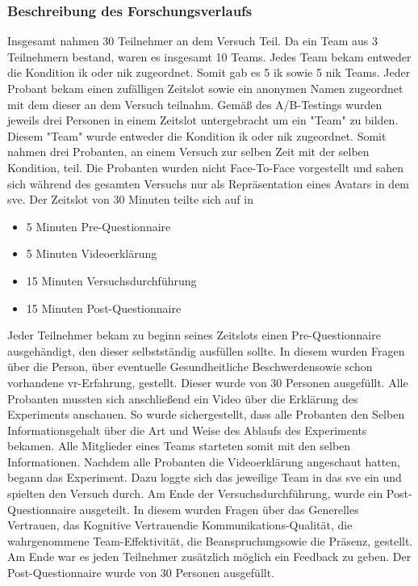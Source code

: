 \documentclass[a4paper,11pt]{article}%
\renewcommand{\\}{\vspace*{0.5\baselineskip} \newline}
\begin{document}
	\subsubsection{Beschreibung des Forschungsverlaufs}
Insgesamt nahmen 30 Teilnehmer an dem Versuch Teil. Da ein Team aus 3 Teilnehmern bestand, waren es insgesamt 10 Teams. Jedes Team bekam entweder die Kondition \ac{ik} oder \ac{nik} zugeordnet. Somit gab es 5 \ac{ik} sowie 5 \ac{nik} Teams.
Jeder Probant bekam einen zufälligen Zeitslot sowie ein anonymen Namen zugeordnet mit dem dieser an dem Versuch teilnahm. Gemäß des A/B-Testings wurden jeweils drei Personen in einem Zeitslot untergebracht um ein "Team" zu bilden. Diesem "Team" wurde entweder die Kondition \ac{ik} oder \ac{nik} zugeordnet. Somit nahmen drei Probanten, an einem Versuch zur selben Zeit mit der selben Kondition, teil. Die Probanten wurden nicht Face-To-Face vorgestellt und sahen sich während des gesamten Versuchs nur als Repräsentation eines Avatars in dem \ac{sve}. Der Zeitslot von 30 Minuten teilte sich auf in
		\begin{itemize}
			\item 5 Minuten Pre-Questionnaire
			\item 5 Minuten Videoerklärung
			\item 15 Minuten Versuchsdurchführung
			\item 15 Minuten Post-Questionnaire
		\end{itemize}
Jeder Teilnehmer bekam zu beginn seines Zeitslots einen Pre-Questionnaire ausgehändigt, den dieser selbstständig ausfüllen sollte. In diesem wurden Fragen über die \flqq Person\frqq, über eventuelle \flqq Gesundheitliche Beschwerden\frqq sowie schon vorhandene \flqq \ac{vr}-Erfahrung\frqq, gestellt.
Dieser wurde von 30 Personen ausgefüllt.
Alle Probanten mussten sich anschließend ein Video über die Erklärung des Experiments anschauen. So wurde sichergestellt, dass alle Probanten den Selben Informationsgehalt über die Art und Weise des Ablaufs des Experiments bekamen. Alle Mitglieder eines Teams starteten somit mit den selben Informationen.
Nachdem alle Probanten die Videoerklärung angeschaut hatten, begann das Experiment. Dazu loggte sich das jeweilige Team in das \ac{sve} ein und spielten den Versuch durch.
		Am Ende der Versuchsdurchführung, wurde ein Post-Questionnaire ausgeteilt. In diesem wurden Fragen über das \flqq Generelles Vertrauen\frqq, das \flqq Kognitive Vertrauen\frqq die \flqq Kommunikations-Qualität\frqq, die wahrgenommene \flqq Team-Effektivität\frqq, die \flqq Beanspruchung\frqq sowie die \flqq Präsenz\frqq, gestellt. Am Ende war es jeden Teilnehmer zusätzlich möglich ein Feedback zu geben. Der Post-Questionnaire wurde von 30 Personen ausgefüllt. 
		
\end{document}
